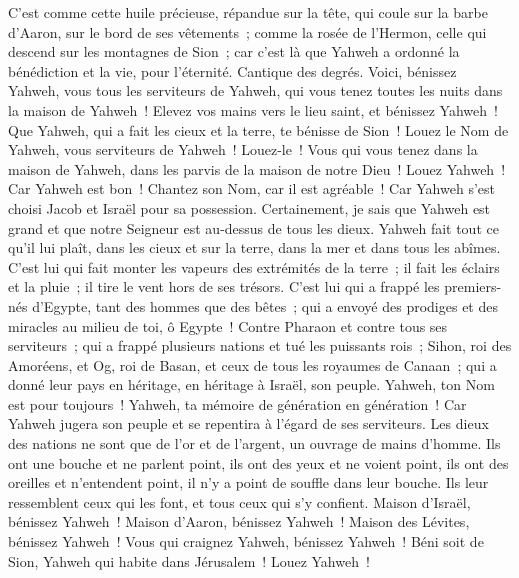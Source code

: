 \begin{multicols}{2}
C'est comme cette huile précieuse, répandue sur la tête, qui coule sur la barbe d'Aaron, sur le bord de ses vêtements~;
comme la rosée de l'Hermon, celle qui descend sur les montagnes de Sion~; car c'est là que Yahweh a ordonné la bénédiction et la vie, pour l'éternité.
\VerseOne{}Cantique des degrés. Voici, bénissez Yahweh, vous tous les serviteurs de Yahweh, qui vous tenez toutes les nuits dans la maison de Yahweh~!
Elevez vos mains vers le lieu saint, et bénissez Yahweh~!
Que Yahweh, qui a fait les cieux et la terre, te bénisse de Sion~!
\VerseOne{}Louez le Nom de Yahweh, vous serviteurs de Yahweh~! Louez-le~!
Vous qui vous tenez dans la maison de Yahweh, dans les parvis de la maison de notre Dieu~!
Louez Yahweh~! Car Yahweh est bon~! Chantez son Nom, car il est agréable~!
Car Yahweh s'est choisi Jacob et Israël pour sa possession.
Certainement, je sais que Yahweh est grand et que notre Seigneur est au-dessus de tous les dieux.
Yahweh fait tout ce qu'il lui plaît, dans les cieux et sur la terre, dans la mer et dans tous les abîmes.
C'est lui qui fait monter les vapeurs des extrémités de la terre~; il fait les éclairs et la pluie~; il tire le vent hors de ses trésors.
C'est lui qui a frappé les premiers-nés d'Egypte, tant des hommes que des bêtes~;
qui a envoyé des prodiges et des miracles au milieu de toi, ô Egypte~! Contre Pharaon et contre tous ses serviteurs~;
qui a frappé plusieurs nations et tué les puissants rois~;
Sihon, roi des Amoréens, et Og, roi de Basan, et ceux de tous les royaumes de Canaan~;
qui a donné leur pays en héritage, en héritage à Israël, son peuple.
Yahweh, ton Nom est pour toujours~! Yahweh, ta mémoire de génération en génération~!
Car Yahweh jugera son peuple et se repentira à l'égard de ses serviteurs.
Les dieux des nations ne sont que de l'or et de l'argent, un ouvrage de mains d'homme.
Ils ont une bouche et ne parlent point, ils ont des yeux et ne voient point,
ils ont des oreilles et n'entendent point, il n'y a point de souffle dans leur bouche.
Ils leur ressemblent ceux qui les font, et tous ceux qui s'y confient.
Maison d'Israël, bénissez Yahweh~! Maison d'Aaron, bénissez Yahweh~!
Maison des Lévites, bénissez Yahweh~! Vous qui craignez Yahweh, bénissez Yahweh~!
Béni soit de Sion, Yahweh qui habite dans Jérusalem~! Louez Yahweh~!

\end{multicols}

